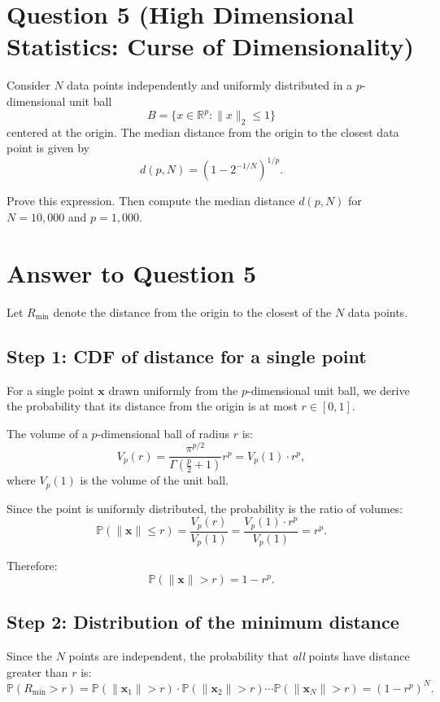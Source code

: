 \documentclass{article}
\begin{document}
\newpage
\section*{Question 5 (High Dimensional Statistics: Curse of Dimensionality)}

Consider $N$ data points independently and uniformly distributed in a
$p$-dimensional unit ball
\[
B=\{x\in\mathbb{R}^p : \|x\|_2 \le 1\}
\]
centered at the origin. The median distance from the origin to the closest
data point is given by
\[
d(p,N)=\left(1-2^{-1/N}\right)^{1/p}.
\]

Prove this expression. Then compute the median distance $d(p,N)$ for
$N=10{,}000$ and $p=1{,}000$.

\section*{Answer to Question 5}

Let $R_{\min}$ denote the distance from the origin to the closest of the
$N$ data points.

\subsection*{Step 1: CDF of distance for a single point}

For a single point $\mathbf{x}$ drawn uniformly from the $p$-dimensional unit ball, we derive the probability that its distance from the origin is at most $r \in [0,1]$.

The volume of a $p$-dimensional ball of radius $r$ is:
\[
V_p(r) = \frac{\pi^{p/2}}{\Gamma\left(\frac{p}{2}+1\right)} r^p = V_p(1) \cdot r^p,
\]
where $V_p(1)$ is the volume of the unit ball.

Since the point is uniformly distributed, the probability is the ratio of volumes:
\[
\mathbb{P}(\|\mathbf{x}\| \le r) = \frac{V_p(r)}{V_p(1)} = \frac{V_p(1) \cdot r^p}{V_p(1)} = r^p.
\]

Therefore:
\[
\mathbb{P}(\|\mathbf{x}\| > r) = 1 - r^p.
\]

\subsection*{Step 2: Distribution of the minimum distance}

Since the $N$ points are independent, the probability that \textit{all} points have distance greater than $r$ is:
\[
\mathbb{P}(R_{\min} > r) = \mathbb{P}(\|\mathbf{x}_1\| > r) \cdot \mathbb{P}(\|\mathbf{x}_2\| > r) \cdots \mathbb{P}(\|\mathbf{x}_N\| > r) = (1 - r^p)^N.
\]
\end{document}
